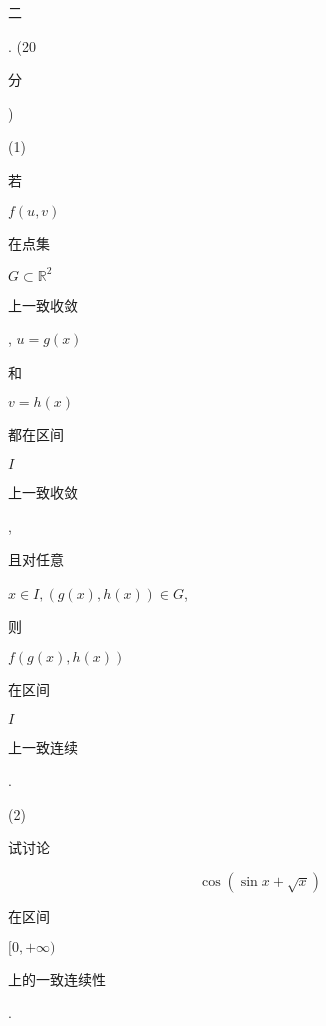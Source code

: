 \documentclass[10pt]{article}
\begin{document}
\begin{CJK}{UTF8}{mj}二\end{CJK}. (20 \begin{CJK}{UTF8}{mj}分\end{CJK})

(1) \begin{CJK}{UTF8}{mj}若\end{CJK} $f(u, v)$ \begin{CJK}{UTF8}{mj}在点集\end{CJK} $G \subset \mathbb{R}^{2}$ \begin{CJK}{UTF8}{mj}上一致收敛\end{CJK}, $u=g(x)$ \begin{CJK}{UTF8}{mj}和\end{CJK} $v=h(x)$ \begin{CJK}{UTF8}{mj}都在区间\end{CJK} $I$ \begin{CJK}{UTF8}{mj}上一致收敛\end{CJK}, \begin{CJK}{UTF8}{mj}且对任意\end{CJK} $x \in I,(g(x), h(x)) \in G$, \begin{CJK}{UTF8}{mj}则\end{CJK} $f(g(x), h(x))$ \begin{CJK}{UTF8}{mj}在区间\end{CJK} $I$ \begin{CJK}{UTF8}{mj}上一致连续\end{CJK}.

(2) \begin{CJK}{UTF8}{mj}试讨论\end{CJK}
$$
\cos (\sin x+\sqrt{x})
$$
\begin{CJK}{UTF8}{mj}在区间\end{CJK} $[0,+\infty)$ \begin{CJK}{UTF8}{mj}上的一致连续性\end{CJK}.
\end{document}

